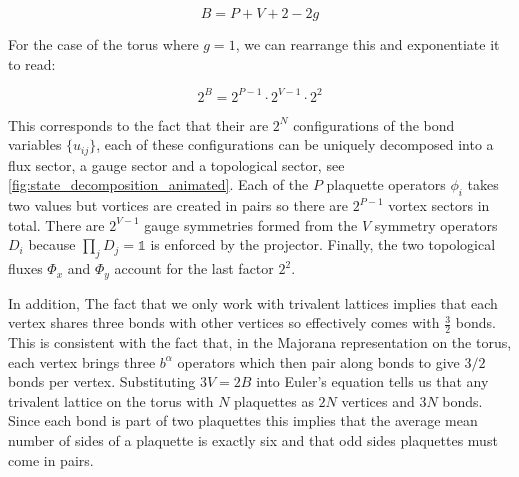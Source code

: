 \[B = P + V + 2 - 2g\]

For the case of the torus where \(g = 1\), we can rearrange this and exponentiate it to read:

\[2^B = 2^{P-1}\cdot 2^{V-1} \cdot 2^2\]

This corresponds to the fact that their are \(2^N\) configurations of the bond variables \(\{u_{ij}\}\), each of these configurations can be uniquely decomposed into a flux sector, a gauge sector and a topological sector, see \cref{fig:state_decomposition_animated}. Each of the \(P\) plaquette operators \(\phi_i\) takes two values but vortices are created in pairs so there are \(2^{P-1}\) vortex sectors in total. There are \(2^{V-1}\) gauge symmetries formed from the \(V\) symmetry operators \(D_i\) because \(\prod_{j} D_j = \mathbb{1}\) is enforced by the projector. Finally, the two topological fluxes \(\Phi_x\) and \(\Phi_y\) account for the last factor \(2^2\).

In addition, The fact that we only work with trivalent lattices implies that each vertex shares three bonds with other vertices so effectively comes with \(\tfrac{3}{2}\) bonds. This is consistent with the fact that, in the Majorana representation on the torus, each vertex brings three \(b^\alpha\) operators which then pair along bonds to give \(3/2\) bonds per vertex. Substituting \(3V = 2B\) into Euler's equation tells us that any trivalent lattice on the torus with \(N\) plaquettes as \(2N\) vertices and \(3N\) bonds. Since each bond is part of two plaquettes this implies that the average mean number of sides of a plaquette is exactly six and that odd sides plaquettes must come in pairs.
